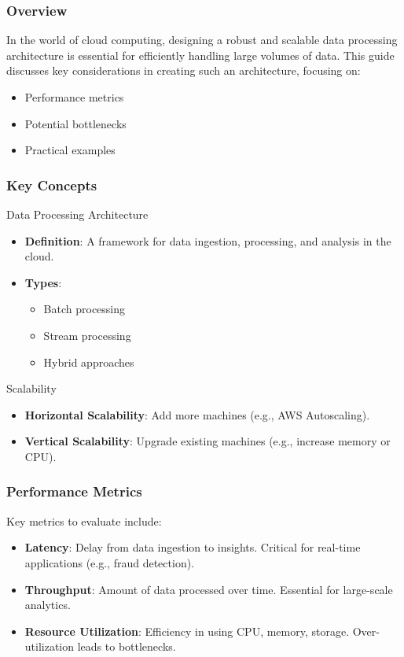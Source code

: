\documentclass[aspectratio=169]{beamer}
\begin{document}
\begin{frame}[fragile]
    \frametitle{Overview}
    In the world of cloud computing, designing a robust and scalable data processing architecture is essential for efficiently handling large volumes of data. This guide discusses key considerations in creating such an architecture, focusing on:
    \begin{itemize}
        \item Performance metrics
        \item Potential bottlenecks
        \item Practical examples
    \end{itemize}
\end{frame}

\begin{frame}[fragile]
    \frametitle{Key Concepts}
    \begin{block}{Data Processing Architecture}
        \begin{itemize}
            \item \textbf{Definition}: A framework for data ingestion, processing, and analysis in the cloud.
            \item \textbf{Types}:
            \begin{itemize}
                \item Batch processing
                \item Stream processing
                \item Hybrid approaches
            \end{itemize}
        \end{itemize}
    \end{block}

    \begin{block}{Scalability}
        \begin{itemize}
            \item \textbf{Horizontal Scalability}: Add more machines (e.g., AWS Autoscaling).
            \item \textbf{Vertical Scalability}: Upgrade existing machines (e.g., increase memory or CPU).
        \end{itemize}
    \end{block}
\end{frame}

\begin{frame}[fragile]
    \frametitle{Performance Metrics}
    Key metrics to evaluate include:
    \begin{itemize}
        \item \textbf{Latency}: Delay from data ingestion to insights. Critical for real-time applications (e.g., fraud detection).
        \item \textbf{Throughput}: Amount of data processed over time. Essential for large-scale analytics.
        \item \textbf{Resource Utilization}: Efficiency in using CPU, memory, storage. Over-utilization leads to bottlenecks.
    \end{itemize}
\end{frame}
\end{document}
